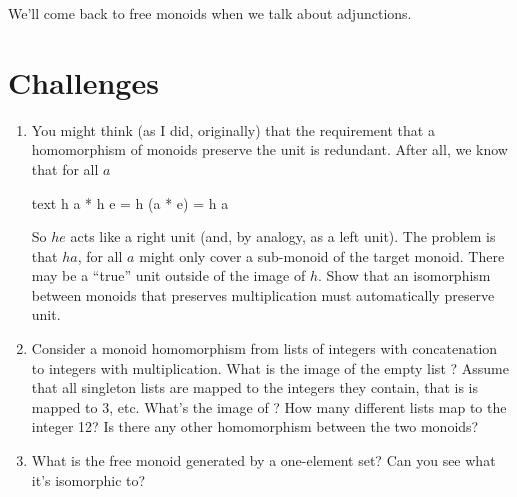 We'll come back to free monoids when we talk about adjunctions.

\section{Challenges}

\begin{enumerate}
\tightlist
\item
  You might think (as I did, originally) that the requirement that a
  homomorphism of monoids preserve the unit is redundant. After all, we
  know that for all $a$

\begin{snip}{text}
h a * h e = h (a * e) = h a
\end{snip}
  So $h e$ acts like a right unit (and, by analogy, as a left
  unit). The problem is that $h a$, for all $a$ might
  only cover a sub-monoid of the target monoid. There may be a ``true''
  unit outside of the image of $h$. Show that an isomorphism
  between monoids that preserves multiplication must automatically
  preserve unit.
\item
  Consider a monoid homomorphism from lists of integers with
  concatenation to integers with multiplication. What is the image of
  the empty list \code{{[}{]}}? Assume that all singleton lists are
  mapped to the integers they contain, that is \code{{[}3{]}} is
  mapped to 3, etc. What's the image of \code{{[}1, 2, 3, 4{]}}?
  How many different lists map to the integer 12? Is there any other
  homomorphism between the two monoids?
\item
  What is the free monoid generated by a one-element set? Can you see
  what it's isomorphic to?
\end{enumerate}
